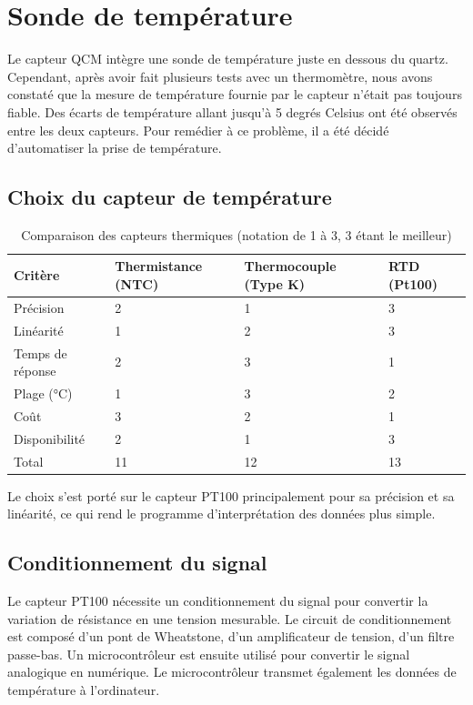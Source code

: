 \chapter{Sonde de température}
Le capteur QCM intègre une sonde de température juste en dessous du quartz. Cependant, après avoir fait plusieurs tests avec un thermomètre, nous avons constaté que la mesure de température fournie par le capteur n'était pas toujours fiable. Des écarts de température allant jusqu'à 5 degrés Celsius ont été observés entre les deux capteurs.
Pour remédier à ce problème, il a été décidé d'automatiser la prise de température.

\section{Choix du capteur de température}

\begin{table}[H]
\centering
\begin{tabularx}{\textwidth}{|l|X|X|X|}
\hline
\textbf{Critère}      & \textbf{Thermistance (NTC)} & \textbf{Thermocouple (Type K)} & \textbf{RTD (Pt100)} \\
\hline
Précision             & 2 & 1 & 3 \\
Linéarité             & 1 & 2 & 3 \\
Temps de réponse      & 2 & 3 & 1 \\
Plage (°C)            & 1 & 3 & 2 \\
Coût                  & 3 & 2 & 1 \\
Disponibilité         & 2 & 1 & 3 \\
\hline
Total                 & 11 & 12 & 13 \\
\hline
\end{tabularx}
\caption{Comparaison des capteurs thermiques (notation de 1 à 3, 3 étant le meilleur)}
\end{table}

Le choix s'est porté sur le capteur PT100 principalement pour sa précision et sa linéarité, ce qui rend le programme d'interprétation des données plus simple.

\section{Conditionnement du signal}
Le capteur PT100 nécessite un conditionnement du signal pour convertir la variation de résistance en une tension mesurable.
Le circuit de conditionnement est composé d'un pont de Wheatstone, d'un amplificateur de tension, d'un filtre passe-bas. Un microcontrôleur est ensuite utilisé pour convertir le signal analogique en numérique. Le microcontrôleur transmet également les données de température à l'ordinateur.

